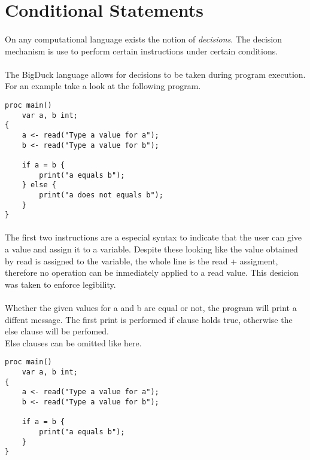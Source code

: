 \section{Conditional Statements}

\paragraph{} On any computational language exists the notion of
\emph{decisions}. The decision mechanism is use to perform certain instructions
under certain conditions.

\paragraph{} The BigDuck language allows for decisions to be taken during
program execution. For an example take a look at the following program.

\begin{verbatim}
proc main()
    var a, b int;
{
    a <- read("Type a value for a");
    b <- read("Type a value for b");

    if a = b {
        print("a equals b");
    } else {
        print("a does not equals b");
    }
}
\end{verbatim}

\paragraph{} The first two instructions are a especial syntax to indicate that
the user can give a value and assign it to a variable. Despite these looking
like the value obtained by read is assigned to the variable, the whole line
is the read + assigment, therefore no operation can be inmediately applied to a
read value. This desicion was taken to enforce legibility.

\paragraph{} Whether the given values for a and b are equal or not, the program
will print a diffent message. The first print is performed if clause holds true,
otherwise the else clause will be perfomed.\\

\noindent
Else clauses can be omitted like here.

\begin{verbatim}
proc main()
    var a, b int;
{
    a <- read("Type a value for a");
    b <- read("Type a value for b");

    if a = b {
        print("a equals b");
    }
}
\end{verbatim}

